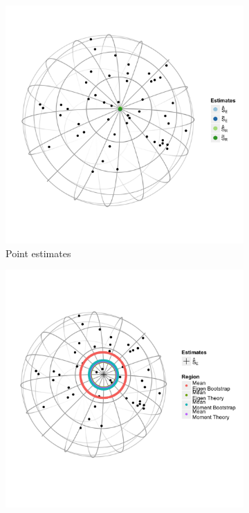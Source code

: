 \begin{figure}[h]
	\centering
	\begin{subfigure}[h]{.25\textheight}
		\centering
		\includegraphics[width=\textwidth]{figures/eye2}\vspace{-1em}
		\caption{Point estimates}
		\label{fig:ests}
	\end{subfigure}
	\begin{subfigure}[h]{.25\textheight}
		\centering
		\includegraphics[width=\textwidth]{figures/eye3}\vspace{-1em}

\end{subfigure}
\end{figure}
